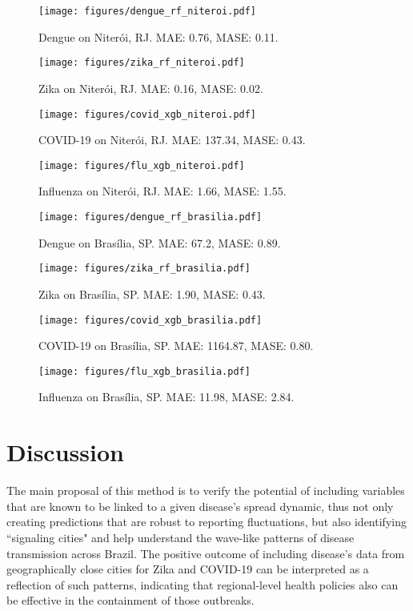 \begin{figure*}
	\begin{subfigure}[t]{0.22\textwidth}
		\texttt{[image: figures/dengue\_rf\_niteroi.pdf]}
		\caption{Dengue on Niterói, RJ. MAE: 0.76, MASE: 0.11.}
	\end{subfigure}    \begin{subfigure}[t]{0.22\textwidth}
		\texttt{[image: figures/zika\_rf\_niteroi.pdf]}
		\caption{Zika on Niterói, RJ. MAE: 0.16, MASE: 0.02.}
	\end{subfigure}	\begin{subfigure}[t]{0.22\textwidth}
		\texttt{[image: figures/covid\_xgb\_niteroi.pdf]}
		\caption{COVID-19 on Niterói, RJ. MAE: 137.34, MASE: 0.43.}
	\end{subfigure}
    \begin{subfigure}[t]{0.22\textwidth}
		\texttt{[image: figures/flu\_xgb\_niteroi.pdf]}
		\caption{Influenza on Niterói, RJ. MAE: 1.66, MASE: 1.55.}
	\end{subfigure}	
	\begin{subfigure}[t]{0.22\textwidth}
		\texttt{[image: figures/dengue\_rf\_brasilia.pdf]}
		\caption{Dengue on Brasília, SP. MAE: 67.2, MASE: 0.89.}
	\end{subfigure}    \begin{subfigure}[t]{0.22\textwidth}
		\texttt{[image: figures/zika\_rf\_brasilia.pdf]}
		\caption{Zika on Brasília, SP. MAE: 1.90, MASE: 0.43.}
	\end{subfigure}	\begin{subfigure}[t]{0.22\textwidth}
		\texttt{[image: figures/covid\_xgb\_brasilia.pdf]}
		\caption{COVID-19 on Brasília, SP. MAE: 1164.87, MASE: 0.80.}
	\end{subfigure}
    \begin{subfigure}[t]{0.22\textwidth}
		\texttt{[image: figures/flu\_xgb\_brasilia.pdf]}
		\caption{Influenza on Brasília, SP. MAE: 11.98, MASE: 2.84.}
	\end{subfigure} 
\end{figure*}


\section{Discussion}
\label{sec:discussion}


The main proposal of this method is to verify the potential of including variables that are known to be linked to a given disease's spread dynamic, thus not only creating predictions that are robust to reporting fluctuations, but also identifying ``signaling cities" and help understand the wave-like patterns of disease transmission across Brazil. The positive outcome of including disease's data from geographically close cities for Zika and COVID-19 can be interpreted as a reflection of such patterns, indicating that regional-level health policies also can be effective in the containment of those outbreaks.

